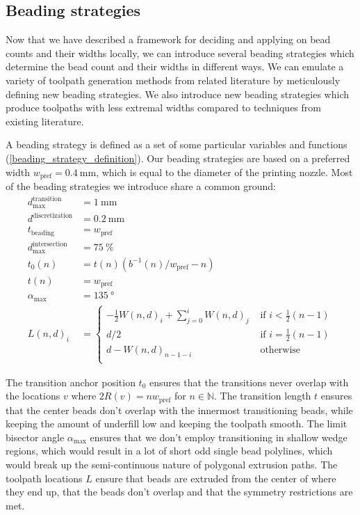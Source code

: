 \subsection{Beading strategies}

Now that we have described a framework for deciding and applying on bead counts and their widths locally, we can introduce several beading strategies which determine the bead count and their widths in different ways.
We can emulate a variety of toolpath generation methods from related literature by meticulously defining new beading strategies.
We also introduce new beading strategies which produce toolpaths with less extremal widths compared to techniques from existing literature.

A beading strategy is defined as a set of some particular variables and functions (\cref{beading_strategy_definition}).
Our beading strategies are based on a preferred width $w_\text{pref} = \SI{0.4}{\milli\meter}$, which is equal to the diameter of the printing nozzle.
Most of the beading strategies we introduce share a common ground:
\begin{align*}
d_\text{max}^\text{transition} &= \SI{1}{\milli\meter} \\
d^\text{discretization} &= \SI{0.2}{\milli\meter} \\
t_\text{beading} &= w_\text{pref} \\
d_\text{max}^\text{intersection} &= \SI{75}{\percent} \\
%
t_0(n) &=  t(n) \left( b^{-1}(n) / w_\text{pref}  - n \right) \\
t(n) &= w_\text{pref} \\
\alpha_\text{max} &= \SI{135}{\degree} \\
L(n,d)_i &= 
\begin{cases}
-\frac12 W(n,d)_i + \sum_{j=0}^i W(n,d)_j & \text{ if } i < \frac12 (n -1) \\
d/2 & \text{ if } i =  \frac12 (n -1) \\
d - W(n,d)_{n-1-i} & \text{ otherwise }\\
\end{cases}
\end{align*}

The transition anchor position $t_0$ ensures that the transitions never overlap with the locations $v$ where $2 R(v) = n w_\text{pref}$ for $n \in \mathbb{N}$.
The transition length $t$ ensures that the center beads don't overlap with the innermost transitioning beads, while keeping the amount of underfill low and keeping the toolpath smooth.
The limit bisector angle $\alpha_\text{max}$ ensures that we don't employ transitioning in shallow wedge regions, which would result in a lot of short odd single bead polylines, which would break up the semi-continuous nature of polygonal extrusion paths.
The toolpath locations $L$ ensure that beads are extruded from the center of where they end up, that the beads don't overlap and that the symmetry restrictions are met.


